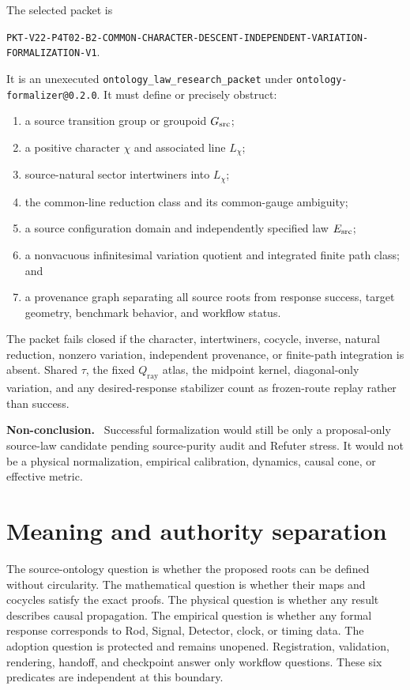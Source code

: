 \documentclass[11pt]{article}
\newenvironment{nonconclusion}{\par\smallskip\noindent\textbf{Non-conclusion.}\ }{\par\smallskip}
\newcommand{\Qray}{Q_{\mathrm{ray}}}
\begin{document}
The selected packet is
\begin{center}
\nolinkurl{PKT-V22-P4T02-B2-COMMON-CHARACTER-DESCENT-INDEPENDENT-VARIATION-FORMALIZATION-V1}.
\end{center}
It is an unexecuted
\nolinkurl{ontology_law_research_packet} under
\nolinkurl{ontology-formalizer@0.2.0}.  It must define or precisely obstruct:
\begin{enumerate}
  \item a source transition group or groupoid $G_{\rm src}$;
  \item a positive character $\chi$ and associated line $L_\chi$;
  \item source-natural sector intertwiners into $L_\chi$;
  \item the common-line reduction class and its common-gauge ambiguity;
  \item a source configuration domain and independently specified law
        $E_{\rm src}$;
  \item a nonvacuous infinitesimal variation quotient and integrated finite
        path class; and
  \item a provenance graph separating all source roots from response success,
        target geometry, benchmark behavior, and workflow status.
\end{enumerate}

The packet fails closed if the character, intertwiners, cocycle, inverse,
natural reduction, nonzero variation, independent provenance, or finite-path
integration is absent.  Shared $\tau$, the fixed $\Qray$ atlas, the midpoint
kernel, diagonal-only variation, and any desired-response stabilizer count as
frozen-route replay rather than success.

\begin{nonconclusion}
Successful formalization would still be only a proposal-only source-law
candidate pending source-purity audit and Refuter stress.  It would not be a
physical normalization, empirical calibration, dynamics, causal cone, or
effective metric.
\end{nonconclusion}

\section{Meaning and authority separation}

The source-ontology question is whether the proposed roots can be defined
without circularity.  The mathematical question is whether their maps and
cocycles satisfy the exact proofs.  The physical question is whether any
result describes causal propagation.  The empirical question is whether any
formal response corresponds to Rod, Signal, Detector, clock, or timing data.
The adoption question is protected and remains unopened.  Registration,
validation, rendering, handoff, and checkpoint answer only workflow questions.
These six predicates are independent at this boundary.
\end{document}
